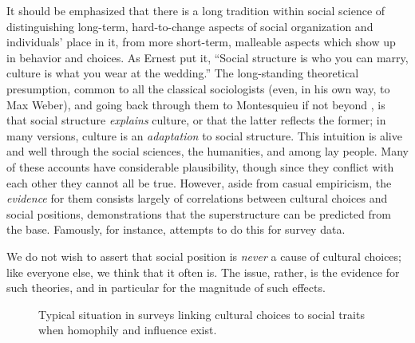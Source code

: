 \documentclass{article}
\begin{document}
\begin{multicols}{2}
It should be emphasized that there is a long tradition within social science of
distinguishing long-term, hard-to-change aspects of social organization and
individuals' place in it, from more short-term, malleable aspects which show up
in behavior and choices.  As Ernest \citet{Gellner-cause-and-meaning} put it,
``Social structure is who you can marry, culture is what you wear at the
wedding.''  The long-standing theoretical presumption, common to all the
classical sociologists (even, in his own way, to Max Weber), and going back
through them to Montesquieu if not beyond \citep{Aron-main-currents}, is that
social structure {\em explains} culture, or that the latter reflects the
former; in many versions, culture is an {\em adaptation} to social structure.
This intuition is alive and well through the social sciences, the humanities,
and among lay people.  Many of these accounts have considerable plausibility,
though since they conflict with each other they cannot all be true.  However,
aside from casual empiricism, the {\em evidence} for them consists largely of
correlations between cultural choices and social positions, demonstrations that
the superstructure can be predicted from the base.  Famously, for instance,
\citet{Bourdieu-distinction} attempts to do this for survey data.

We do not wish to assert that social position is {\em never} a cause of
cultural choices; like everyone else, we think that it often is.  The issue,
rather, is the evidence for such theories, and in particular for the magnitude
of such effects.

\begin{figure}
\begin{center}
\end{center}
  \caption{Typical situation in surveys linking cultural choices to social
    traits when homophily and influence exist.}
  \label{fig:survey-regression2}
\end{figure}




\end{multicols}
\end{document}
